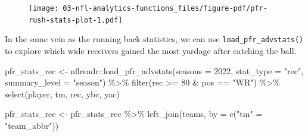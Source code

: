 \documentclass[
  letterpaper,
]{krantz}
\newenvironment{Shaded}{\begin{snugshade}}{\end{snugshade}}
\newcommand{\AttributeTok}[1]{\textcolor[rgb]{0.40,0.45,0.13}{#1}}
\newcommand{\DecValTok}[1]{\textcolor[rgb]{0.68,0.00,0.00}{#1}}
\newcommand{\FunctionTok}[1]{\textcolor[rgb]{0.28,0.35,0.67}{#1}}
\newcommand{\NormalTok}[1]{\textcolor[rgb]{0.00,0.23,0.31}{#1}}
\newcommand{\OtherTok}[1]{\textcolor[rgb]{0.00,0.23,0.31}{#1}}
\newcommand{\SpecialCharTok}[1]{\textcolor[rgb]{0.37,0.37,0.37}{#1}}
\newcommand{\StringTok}[1]{\textcolor[rgb]{0.13,0.47,0.30}{#1}}
\begin{document}
\begin{figure}[H]

{\centering \texttt{[image: 03-nfl-analytics-functions\_files/figure-pdf/pfr-rush-stats-plot-1.pdf]}

}

\end{figure}

In the same vein as the running back statistics, we can use
\texttt{load\_pfr\_advstats()} to explore which wide receivers gained
the most yardage after catching the ball.

\begin{Shaded}
\begin{Highlighting}[]
\NormalTok{pfr\_stats\_rec }\OtherTok{\textless{}{-}}\NormalTok{ nflreadr}\SpecialCharTok{::}\FunctionTok{load\_pfr\_advstats}\NormalTok{(}\AttributeTok{seasons =} \DecValTok{2022}\NormalTok{, }\AttributeTok{stat\_type =} \StringTok{"rec"}\NormalTok{,}
                                             \AttributeTok{summary\_level =} \StringTok{"season"}\NormalTok{) }\SpecialCharTok{\%\textgreater{}\%}
  \FunctionTok{filter}\NormalTok{(rec }\SpecialCharTok{\textgreater{}=} \DecValTok{80} \SpecialCharTok{\&}\NormalTok{ pos }\SpecialCharTok{==} \StringTok{"WR"}\NormalTok{) }\SpecialCharTok{\%\textgreater{}\%}
  \FunctionTok{select}\NormalTok{(player, tm, rec, ybc, yac)}

\NormalTok{pfr\_stats\_rec }\OtherTok{\textless{}{-}}\NormalTok{ pfr\_stats\_rec }\SpecialCharTok{\%\textgreater{}\%}
  \FunctionTok{left\_join}\NormalTok{(teams, }\AttributeTok{by =} \FunctionTok{c}\NormalTok{(}\StringTok{"tm"} \OtherTok{=} \StringTok{"team\_abbr"}\NormalTok{))}
\end{Highlighting}
\end{Shaded}
\end{document}
